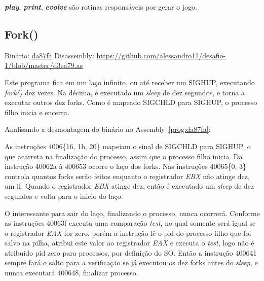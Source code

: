 \par\textbf{\emph{play}}, \textbf{\emph{print}},
\textbf{\emph{evolve}} são rotinas responsáveis por gerar o jogo.


\subsection{Fork()}
Binário: \href{https://s3.amazonaws.com/chaordic-desafio-cloud/da87fa}{da87fa}
Disassembly:
\href{https://github.com/alessandro11/desafio-1/blob/master/d3ea79.as}{https://github.com/alessandro11/desafio-1/blob/master/d3ea79.as}

Este programa fica em um laço infinito, ou até receber um SIGHUP,
executando \emph{fork()} dez vezes. Na décima, é executado um
\emph{sleep} de dez segundos, e torna a executar outros dez
forks. Como é mapeado SIGCHLD para SIGHUP, o processo filho inicia e
encerra.

Analisando a desmontagem do binário no Assembly~\ref{prog:da87fa}:



As instruções 4006\{16, 1b, 20\} mapeiam o sinal de SIGCHLD para
SIGHUP, o que acarreta na finalização do processo, assim que o processo
filho inicia. Da instrução 40062a à 400653 ocorre o laço dos
forks. Nas instruções 40065\{0, 3\} controla quantos forks serão
feitos enquanto o registrador \emph{EBX} não atinge dez, um if. Quando o
registrador \emph{EBX} atinge dez, então é executado um \emph{sleep} de dez
segundos e volta para o inicio do laço.

O interessante para sair do laço, finalizando o processo, nunca
ocorrerá. Conforme as instruções 40063f executa uma comparação
\emph{test}, no qual somente será igual se o registrador \emph{EAX} for zero,
porém a instrução lê o pid do processo filho que foi salvo na pilha,
atribui este valor ao registrador \emph{EAX} e executa o \emph{test}, logo
não é atribuído pid zero para processos, por definição do SO. Então a
instrução 400641 sempre fará o salto para a verificação se já executou
os dez forks antes do \emph{sleep}, e nunca executará 400648,
finalizar processo.
